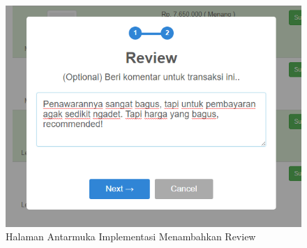 \begin{figure}[H]
\centering
\includegraphics[width=\textwidth]{images/bab4/ui/04-02b.png}
\caption{Halaman Antarmuka Implementasi Menambahkan Review}
\label{ui.04-02b}
\end{figure}

